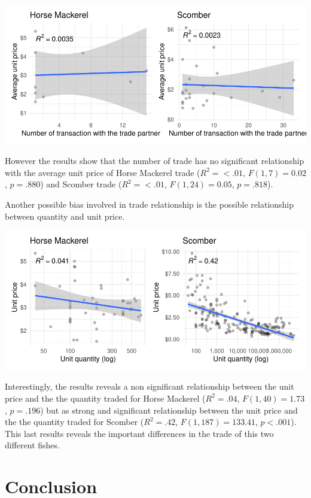 \documentclass[10,a4paperpaper,]{article}
\begin{document}
\includegraphics{report_files/figure-latex/unnamed-chunk-23-1.pdf}

However the results show that the number of trade has no significant
relationship with the average unit price of Horse Mackerel trade
(\(R^2 = < .01\), \(F(1, 7) = 0.02\), \(p = .880\)) and Scomber trade
(\(R^2 = < .01\), \(F(1, 24) = 0.05\), \(p = .818\)).

Another possible bias involved in trade relationship is the possible
relationship between quantity and unit price.

\includegraphics{report_files/figure-latex/unnamed-chunk-24-1.pdf}

Interestingly, the results reveals a non significant relationship
between the unit price and the the quantity traded for Horse Mackerel
(\(R^2 = .04\), \(F(1, 40) = 1.73\), \(p = .196\)) but as strong and
significant relationship between the unit price and the the quantity
traded for Scomber (\(R^2 = .42\), \(F(1, 187) = 133.41\),
\(p < .001\)). This last results reveals the important differences in
the trade of this two different fishes.

\clearpage

\section{Conclusion}
\end{document}
